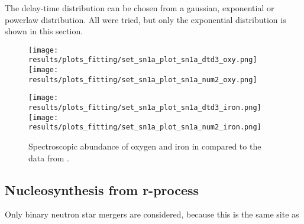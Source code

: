 The delay-time distribution can be chosen from a gaussian, exponential or powerlaw distribution.
All were tried, but only the exponential distribution is shown in this section.

\begin{figure}[h]
  \begin{minipage}[h][][t]{0.4\textwidth}
    \centering
    \texttt{[image: results/plots\_fitting/set\_sn1a\_plot\_sn1a\_dtd3\_oxy.png]}
    \texttt{[image: results/plots\_fitting/set\_sn1a\_plot\_sn1a\_num2\_oxy.png]}
  \end{minipage}
  \hfill
  \begin{minipage}[h][][t]{0.4\textwidth}
    \centering
    \texttt{[image: results/plots\_fitting/set\_sn1a\_plot\_sn1a\_dtd3\_iron.png]}
    \texttt{[image: results/plots\_fitting/set\_sn1a\_plot\_sn1a\_num2\_iron.png]}
  \end{minipage}
  \caption[Fit of type 1a supernovae \fiduccialomega]{\label{fig:fit-sn1a}
    Spectroscopic abundance of oxygen and iron in \omegamodel compared to the data from \eris.
    \\ 
  }
\end{figure}

\begin{table}[h]
  \caption[\omegamodel-parameters from fitting stars and supernovae to \eris]{
    \label{tab:fitting-parameters-sn1a}
  }
\end{table}
\FloatBarrier

\subsection{Nucleosynthesis from r-process}
Only binary neutron star mergers are considered, because this is the same site as 

